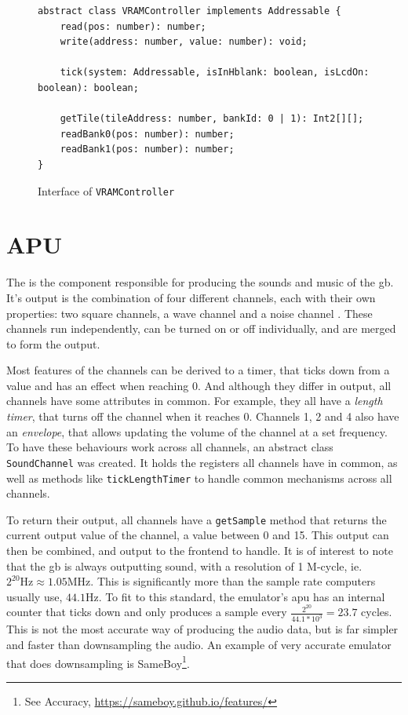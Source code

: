 \documentclass[11pt]{informatics-report}
\begin{document}
\begin{figure}[h]
    \begin{verbatim}
abstract class VRAMController implements Addressable {
    read(pos: number): number;
    write(address: number, value: number): void;

    tick(system: Addressable, isInHblank: boolean, isLcdOn: boolean): boolean;

    getTile(tileAddress: number, bankId: 0 | 1): Int2[][];
    readBank0(pos: number): number;
    readBank1(pos: number): number;
}
    \end{verbatim}
    \caption{Interface of \texttt{VRAMController}}
    \label{fig:vramcontroller-interface}
\end{figure}


\section{APU}

The  is the component responsible for producing the sounds and music of the \gls{gb}. It's output is the combination of four different channels, each with their own properties: two square channels, a wave channel and a noise channel \cite[Audio]{pandoc}. These channels run independently, can be turned on or off individually, and are merged to form the output.

 Most features of the channels can be derived to a timer, that ticks down from a value and has an effect when reaching 0. And although they differ in output, all channels have some attributes in common. For example, they all have a \textit{length timer}, that turns off the channel when it reaches 0. Channels 1, 2 and 4 also have an \textit{envelope}, that allows updating the volume of the channel at a set frequency. To have these behaviours work across all channels, an abstract class \texttt{SoundChannel} was created. It holds the registers all channels have in common, as well as methods like \texttt{tickLengthTimer} to handle common mechanisms across all channels.

To return their output, all channels have a \texttt{getSample} method that returns the current output value of the channel, a value between 0 and 15. This output can then be combined, and output to the frontend to handle. It is of interest to note that the \gls{gb} is always outputting sound, with a resolution of 1 M-cycle, ie. $2^{20}\text{Hz} \approx 1.05\text{MHz}$. This is significantly more than the sample rate computers usually use, $44.1\text{Hz}$. To fit to this standard, the emulator's \gls{apu} has an internal counter that ticks down and only produces a sample every $\frac{2^20}{44.1*10^3}=23.7$ cycles. This is not the most accurate way of producing the audio data, but is far simpler and faster than downsampling the audio. An example of very accurate emulator that does downsampling is SameBoy\footnote{See Accuracy, \url{https://sameboy.github.io/features/}}.
\end{document}
